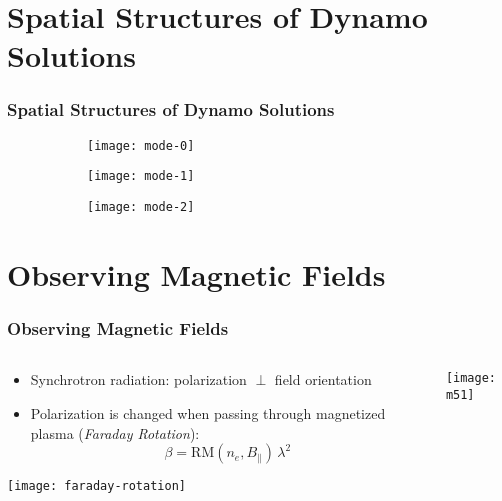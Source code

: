 \documentclass[mathserif]{beamer}
\begin{document}
\section{Spatial Structures of Dynamo Solutions}
\begin{frame}
    \frametitle{Spatial Structures of Dynamo Solutions}

    \begin{figure}
        \centering
        \begin{subfigure}[b]{.35\textwidth}
            \texttt{[image: mode-0]}
        \end{subfigure}
        \begin{subfigure}[b]{.35\textwidth}
            \texttt{[image: mode-1]}
        \end{subfigure}
        \begin{subfigure}[b]{.35\textwidth}
            \texttt{[image: mode-2]}
        \end{subfigure}
    \end{figure}

\end{frame}


\section{Observing Magnetic Fields}
\begin{frame}
    \frametitle{Observing Magnetic Fields}

    \begin{columns}[T]
        \begin{column}[T]{.5\textwidth}
            \begin{itemize}
                \item
                    Synchrotron radiation: polarization $\perp$ field
                    orientation
                \item
                    Polarization is changed when passing through magnetized
                    plasma (\emph{Faraday Rotation}):
                    \[\beta=\mathrm{RM}(n_e, B_{\parallel})\,\lambda^2\]
            \end{itemize}
            \texttt{[image: faraday-rotation]}
        \end{column}

        \begin{column}[T]{.5\textwidth}
            \pause
            \texttt{[image: m51]}
        \end{column}
    \end{columns}

\end{frame}
\end{document}
